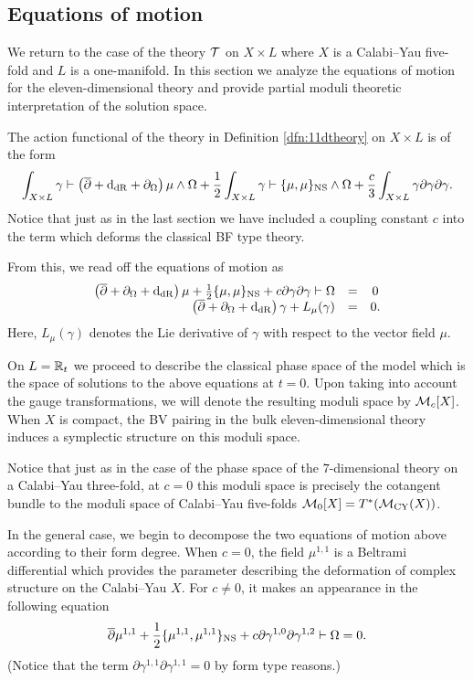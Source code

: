 \documentclass[11pt]{amsart}
\begin{document}
\subsection{Equations of motion}
\label{sec:org2973a4d}
We return to the case of the theory $\mathcal T$ on $X\times L$ where $X$ is a Calabi--Yau five-fold and $L$ is a one-manifold.
In this section we analyze the equations of motion for the eleven-dimensional theory and provide partial moduli theoretic interpretation of the solution space.

The action functional of the theory in Definition \ref{dfn:11dtheory} on $X \times L$ is of the form
\[
  \int_{X \times L} \gamma \vdash \left(\overline{\partial} + {\rm d}_{\rm dR} + \partial_{\Omega}\right) \mu \wedge \Omega + \frac12 \int_{X \times L} \gamma \vdash \{\mu,\mu\}_{\rm NS} \wedge \Omega + \frac{c}{3} \int_{X \times L} \gamma \partial \gamma \partial \gamma .
\]
Notice that just as in the last section we have included a coupling constant $c$ into the term which deforms the classical BF type theory.

From this, we read off the equations of motion as
\begin{equation}\label{eqn:eom}
  \begin{array}{rccc}
    \left(\overline{\partial} + \partial_\Omega + {\rm d}_{\rm dR} \right) \mu + \frac12 \{\mu, \mu\}_{\rm NS} + c \partial \gamma \partial \gamma \vdash \Omega & = & 0 \\
    \left(\overline{\partial} + \partial_\Omega + {\rm d}_{\rm dR} \right) \gamma + L_\mu (\gamma) & = & 0 .
  \end{array}
\end{equation}
Here, $L_\mu(\gamma)$ denotes the Lie derivative of $\gamma$ with respect to the vector field $\mu$.

On $L = \mathbb R_t$ we proceed to describe the classical phase space of the model which is the space of solutions to the above equations at $t = 0$.
Upon taking into account the gauge transformations, we will denote the resulting moduli space by $\mathcal M_c[X]$.
When $X$ is compact, the BV pairing in the bulk eleven-dimensional theory induces a symplectic structure on this moduli space.

Notice that just as in the case of the phase space of the $7$-dimensional theory on a Calabi--Yau three-fold, at $c=0$ this moduli space is precisely the cotangent bundle to the moduli space of Calabi--Yau five-folds $\mathcal M_0 [X] = T^*(\mathcal M_{\rm CY}(X))$.

In the general case, we begin to decompose the two equations of motion above according to their form degree.
When $c = 0$, the field $\mu^{1,1}$ is a Beltrami differential which provides the parameter describing the deformation of complex structure on the Calabi--Yau $X$.
For $c \ne 0$, it makes an appearance in the following equation
\begin{equation}\label{eqn:mu11}
  \overline{\partial} \mu^{1,1} + \frac12 \{\mu^{1,1}, \mu^{1,1}\}_{\rm NS} + c \partial \gamma^{1,0} \partial \gamma^{1,2} \vdash \Omega = 0 .
\end{equation}
(Notice that the term $\partial \gamma^{1,1} \partial \gamma^{1,1} = 0$ by form type reasons.)
\end{document}
